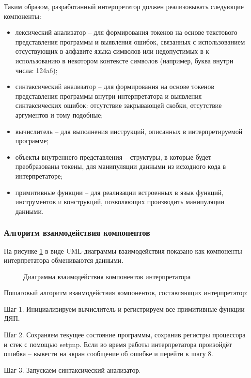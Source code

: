 Таким образом, разработанный интерпретатор должен реализовывать следующие компоненты:
\begin{itemize}
	\item лексический анализатор -- для формирования токенов на основе текстового представления программы и выявления ошибок, связанных с использованием отсуствующих в алфавите языка символов или недопустимых в к использованию в некотором контексте символов (например, буква внутри числа: 124a6);
	\item синтаксический анализатор -- для формирования на основе токенов представления программы внутри интерпретатора и выявления синтаксических ошибок: отсутствие закрывающей скобки, отсутствие аргументов и тому подобные;
	\item вычислитель -- для выполнения инструкций, описанных в интерпретируемой программе;
	\item объекты внутреннего представления -- структуры, в которые будет преобразованы токены, для манипуляции данными из исходного кода в интерпретаторе;
	\item примитивные функции -- для реализации встроенных в язык функций, инструментов и конструкций, позволяющих производить манипуляции данными.
\end{itemize}

\subsubsection{Алгоритм взаимодействия компонентов}

На рисунке \ref{uml_coop:image} в виде UML-диаграммы взаимодействия показано как компоненты интерпретатора обмениваются данными.

\begin{figure}[H]
	\caption{Диаграмма взаимодействия компонентов интерпретатора}
	\label{uml_coop:image}
\end{figure}

Пошаговый алгоритм взаимодействия компонентов, составляющих интерпретатор:

Шаг 1. Инициализируем вычислитель и регистрируем все примитивные функции ДЯП.

Шаг 2. Сохраняем текущее состояние программы, сохранив регистры процессора и стек с помощью setjmp. Если во время работы интерпретатора произойдёт ошибка -- вывести на экран сообщение об ошибке и перейти к шагу 8.

Шаг 3. Запускаем синтаксический анализатор.


